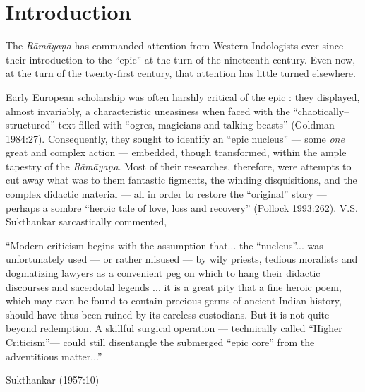 \chapter*{Introduction}\label{introduction}






The {\sl Rāmāyaṇa} has commanded attention from Western Indologists ever since their introduction to the “epic” at the turn of the nineteenth century. Even now, at the turn of the twenty-first century, that attention has little turned elsewhere.  

Early European scholarship was often harshly critical of the epic : they displayed, almost invariably, a characteristic uneasiness when faced with the “chaotically–structured” text filled with “ogres, magicians and talking beasts” (Goldman 1984:27). Consequently, they sought to identify an “epic nucleus” --- some {\sl one} great and complex action --- embedded, though transformed, within the ample tapestry of the {\sl Rāmāyaṇa}. Most of their researches, therefore, were attempts to cut away what was to them fantastic figments, the winding disquisitions, and the complex didactic material --- all in order to restore the “original” story --- perhaps a sombre “heroic tale of love, loss and recovery” (Pollock 1993:262). V.S. Sukthankar sarcastically commented,  

\begin{myquote}
“Modern criticism begins with the assumption that... the “nucleus”... was unfortunately used --- or rather misused --- by wily priests, tedious moralists and dogmatizing lawyers as a convenient peg on which to hang their didactic discourses and sacerdotal legends ... it is a great pity that a fine heroic poem, which may even be found to contain precious germs of ancient Indian history, should have thus been ruined by its careless custodians. But it is not quite beyond redemption. A skillful surgical operation --- technically called “Higher Criticism”— could still disentangle the submerged “epic core” from the adventitious matter...”

\hfill Sukthankar (1957:10)
\end{myquote}

